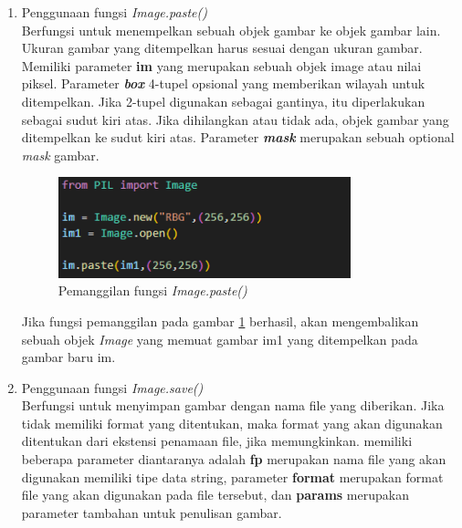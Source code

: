 \begin{enumerate}
	\item Penggunaan fungsi \textit{Image.paste()}\\
	Berfungsi untuk menempelkan sebuah objek gambar ke objek gambar lain. Ukuran gambar yang ditempelkan harus sesuai dengan ukuran gambar. Memiliki parameter \textbf{im} yang merupakan sebuah objek image atau nilai piksel. Parameter \textit{\textbf{box}} 4-tupel opsional yang memberikan wilayah untuk ditempelkan. Jika 2-tupel digunakan sebagai gantinya, itu diperlakukan sebagai sudut kiri atas. Jika dihilangkan atau tidak ada, objek gambar yang ditempelkan ke sudut kiri atas. Parameter \textit{\textbf{mask}} merupakan sebuah optional \textit{mask} gambar.
	\begin{figure}[H]
		\centering
		\includegraphics[width=0.8\textwidth]{Gambar/imagepaste.png}
		\caption{Pemanggilan fungsi \textit{Image.paste()}}
		\label{fig:imagepaste}
	\end{figure}
	Jika fungsi pemanggilan pada gambar \ref{fig:imagepaste} berhasil, akan mengembalikan sebuah objek \textit{Image} yang memuat gambar im1 yang ditempelkan pada gambar baru im.
	\item Penggunaan fungsi \textit{Image.save()}\\
	Berfungsi untuk menyimpan gambar dengan nama file yang diberikan. Jika tidak memiliki format yang ditentukan, maka format yang akan digunakan ditentukan dari ekstensi penamaan file, jika memungkinkan. memiliki beberapa parameter diantaranya adalah \textbf{fp} merupakan nama file yang akan digunakan memiliki tipe data string, parameter \textbf{format} merupakan format file yang akan digunakan pada file tersebut, dan \textbf{params} merupakan parameter tambahan untuk penulisan gambar.
\end{enumerate}


